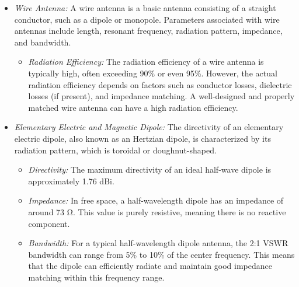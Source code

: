 \documentclass[11pt,a4paper]{article}
\renewcommand{\ohm}{{\mathrm{\Omega}}}
\begin{document}
\begin{itemize}
    \item \emph{Wire Antenna:} A wire antenna is a basic antenna consisting of a straight conductor, such as a dipole or monopole. Parameters associated with wire antennas include length, resonant frequency, radiation pattern, impedance, and bandwidth.
    \begin{itemize}
        \item \emph{Radiation Efficiency:} The radiation efficiency of a wire antenna is typically high, often exceeding 90\% or even 95\%. However, the actual radiation efficiency depends on factors such as conductor losses, dielectric losses (if present), and impedance matching. A well-designed and properly matched wire antenna can have a high radiation efficiency.
    \end{itemize}
    
    \item \emph{Elementary Electric and Magnetic Dipole:} The directivity of an elementary electric dipole, also known as an Hertzian dipole, is characterized by its radiation pattern, which is toroidal or doughnut-shaped.
    \begin{itemize}
        \item \emph{Directivity:} The maximum directivity of an ideal half-wave dipole is approximately 1.76 dBi.
        \item \emph{Impedance:} In free space, a half-wavelength dipole has an impedance of around 73 $\ohm$. This value is purely resistive, meaning there is no reactive component.
        \item \emph{Bandwidth:} For a typical half-wavelength dipole antenna, the 2:1 VSWR bandwidth can range from 5\% to 10\% of the center frequency. This means that the dipole can efficiently radiate and maintain good impedance matching within this frequency range.
    \end{itemize}


\end{itemize}
\end{document}
